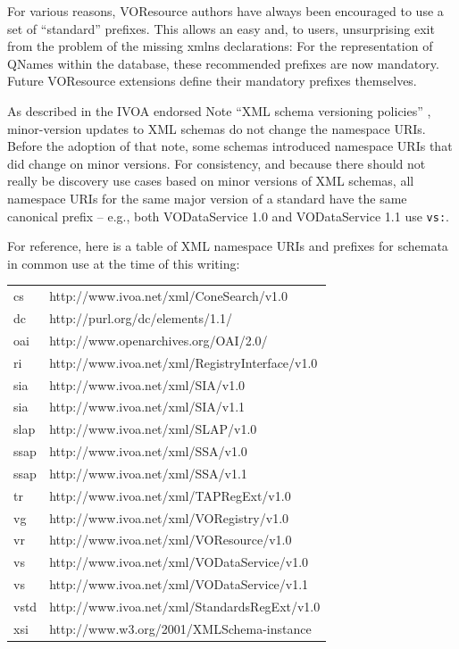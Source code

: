 \documentclass[11pt,a4paper]{ivoa}
\begin{document}
For various reasons, VOResource authors have always been encouraged
to use a set of ``standard'' prefixes.  This allows an easy and, to users,
unsurprising exit from the problem of the missing xmlns declarations:
For the representation of QNames within the database, these recommended
prefixes are now mandatory. Future VOResource extensions define their
mandatory prefixes themselves.

As described in the IVOA endorsed Note ``XML schema versioning
policies'' \citep{2018ivoa.spec.0529H}, minor-version updates to XML
schemas do not change the namespace URIs.  Before the adoption of that
note, some schemas introduced namespace URIs that did change on minor
versions.  For consistency, and because there should not really be
discovery use cases based on minor versions of XML schemas, all
namespace URIs for the same major version of a standard have the same
canonical prefix -- e.g., both VODataService
1.0 and VODataService 1.1 use \texttt{vs:}.  

For reference, here is
a table of XML namespace URIs and prefixes for schemata in common use at
the time of this writing:


\begin{inlinetable}
\begin{tabular}{ll}
cs&http://www.ivoa.net/xml/ConeSearch/v1.0\\
dc&http://purl.org/dc/elements/1.1/\\
oai&http://www.openarchives.org/OAI/2.0/\\
ri&http://www.ivoa.net/xml/RegistryInterface/v1.0\\
sia&http://www.ivoa.net/xml/SIA/v1.0\\
sia&http://www.ivoa.net/xml/SIA/v1.1\\
slap&http://www.ivoa.net/xml/SLAP/v1.0\\
ssap&http://www.ivoa.net/xml/SSA/v1.0\\
ssap&http://www.ivoa.net/xml/SSA/v1.1\\
tr&http://www.ivoa.net/xml/TAPRegExt/v1.0\\
vg&http://www.ivoa.net/xml/VORegistry/v1.0\\
vr&http://www.ivoa.net/xml/VOResource/v1.0\\
vs&http://www.ivoa.net/xml/VODataService/v1.0\\
vs&http://www.ivoa.net/xml/VODataService/v1.1\\
vstd&http://www.ivoa.net/xml/StandardsRegExt/v1.0\\
xsi&http://www.w3.org/2001/XMLSchema-instance\\

\end{tabular}
\end{inlinetable}
\end{document}
